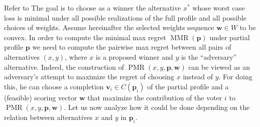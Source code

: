 \documentclass[12pt]{article}
\newcommand{\profile}{\textbf{v}}%
\newcommand{\pprofile}{\textbf{p}}%
\newcommand{\w}{\textbf{w}}%
\DeclareMathOperator{\PMR}{PMR}
\DeclareMathOperator{\MMR}{MMR}
\begin{document}
Refer to \cite{Lu2011}
The goal is to choose as a winner the alternative $x^*$ whose worst case loss is minimal under all possible realizations of the full profile and all possible choices of weights. 
Assume hereinafter the selected weights sequence $\w \in W$ to be convex. 
In order to compute the minimal max regret $\MMR(\pprofile)$ under partial profile $\pprofile$ we need to compute the pairwise max regret between all pairs of alternatives $(x,y)$, where $x$ is a proposed winner and $y$ is the ``adversary'' alternative. Indeed, the construction of $\PMR(x,y,\pprofile,\w)$ can be viewed as an adversary's attempt to maximize the regret of choosing $x$ instead of $y$. 
For doing this, he can choose a completion $\profile_i \in C(\pprofile_i)$ of the partial profile and a (feasible) scoring vector $\w$ that maximize the contribution of the voter $i$ to $\PMR(x,y,\pprofile,\w)$. Let us now analyze how it could be done depending on the relation between alternatives $x$ and $y$ in $\pprofile_i$. 
\end{document}
